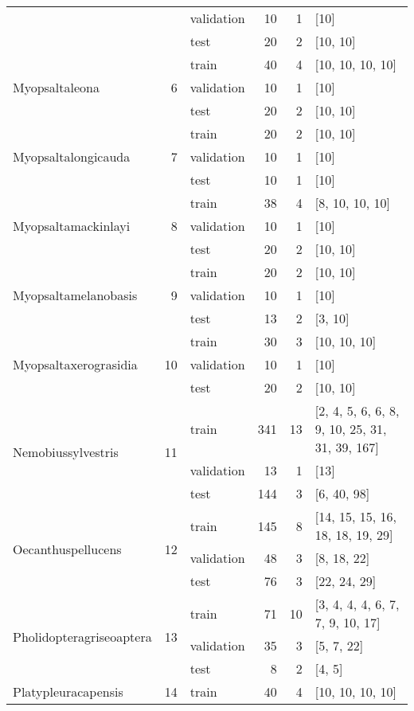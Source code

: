 \begin{longtable}{lrlrrl}
 &  & validation & 10 & 1 & [10] \\
 &  & test & 20 & 2 & [10, 10] \\
\midrule
\multirow{3}{*}{Myopsaltaleona} & \multirow{3}{*}{6} & train & 40 & 4 & [10, 10, 10, 10] \\
 &  & validation & 10 & 1 & [10] \\
 &  & test & 20 & 2 & [10, 10] \\
\midrule
\multirow{3}{*}{Myopsaltalongicauda} & \multirow{3}{*}{7} & train & 20 & 2 & [10, 10] \\
 &  & validation & 10 & 1 & [10] \\
 &  & test & 10 & 1 & [10] \\
\midrule
\multirow{3}{*}{Myopsaltamackinlayi} & \multirow{3}{*}{8} & train & 38 & 4 & [8, 10, 10, 10] \\
 &  & validation & 10 & 1 & [10] \\
 &  & test & 20 & 2 & [10, 10] \\
\midrule
\multirow{3}{*}{Myopsaltamelanobasis} & \multirow{3}{*}{9} & train & 20 & 2 & [10, 10] \\
 &  & validation & 10 & 1 & [10] \\
 &  & test & 13 & 2 & [3, 10] \\
\midrule
\multirow{3}{*}{Myopsaltaxerograsidia} & \multirow{3}{*}{10} & train & 30 & 3 & [10, 10, 10] \\
 &  & validation & 10 & 1 & [10] \\
 &  & test & 20 & 2 & [10, 10] \\
\midrule
\multirow{3}{*}{Nemobiussylvestris} & \multirow{3}{*}{11} & train & 341 & 13 & [2, 4, 5, 6, 6, 8, 9, 10, 25, 31, 31, 39, 167] \\
 &  & validation & 13 & 1 & [13] \\
 &  & test & 144 & 3 & [6, 40, 98] \\
\midrule
\multirow{3}{*}{Oecanthuspellucens} & \multirow{3}{*}{12} & train & 145 & 8 & [14, 15, 15, 16, 18, 18, 19, 29] \\
 &  & validation & 48 & 3 & [8, 18, 22] \\
 &  & test & 76 & 3 & [22, 24, 29] \\
\midrule
\multirow{3}{*}{Pholidopteragriseoaptera} & \multirow{3}{*}{13} & train & 71 & 10 & [3, 4, 4, 4, 6, 7, 7, 9, 10, 17] \\
 &  & validation & 35 & 3 & [5, 7, 22] \\
 &  & test & 8 & 2 & [4, 5] \\
\midrule
\multirow{3}{*}{Platypleuracapensis} & \multirow{3}{*}{14} & train & 40 & 4 & [10, 10, 10, 10] \\

\end{longtable}
